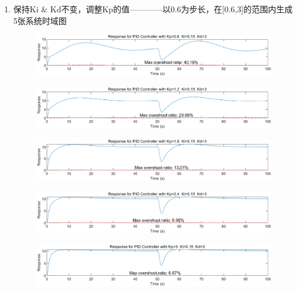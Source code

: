 \documentclass{thuemp}
\begin{document}
\begin{enumerate}
\item 保持Ki \& Kd不变，调整Kp的值————以0.6为步长，在[0.6,3]的范围内生成5张系统时域图
  \begin{figure}[H]
    \centering
    \includegraphics[width=1\linewidth]{./img/PID_with_noise/id1.png}
  \end{figure}
  \begin{figure}[H]
    \centering
    \includegraphics[width=1\linewidth]{./img/PID_with_noise/id2.png}
  \end{figure}
  \begin{figure}[H]
    \centering
    \includegraphics[width=1\linewidth]{./img/PID_with_noise/id3.png}
  \end{figure}
  \begin{figure}[H]
    \centering
    \includegraphics[width=1\linewidth]{./img/PID_with_noise/id4.png}
  \end{figure}
  \begin{figure}[H]
    \centering
    \includegraphics[width=1\linewidth]{./img/PID_with_noise/id5.png}
  \end{figure}

\end{enumerate}
\end{document}
